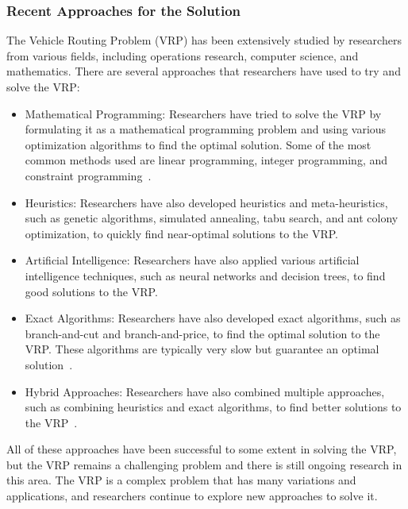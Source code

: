 \subsubsection{Recent Approaches for the Solution}
The Vehicle Routing Problem (VRP) has been extensively studied by researchers from various fields, including operations research, computer science, and mathematics. There are several approaches that researchers have used to try and solve the VRP:
\begin{itemize}
    \item Mathematical Programming: Researchers have tried to solve the VRP by formulating it as a mathematical programming problem and using various optimization algorithms to find the optimal solution.
    Some of the most common methods used are linear programming, integer programming, and constraint programming~\cite{toth2002overview}.
    \item Heuristics: Researchers have also developed heuristics and meta-heuristics, such as genetic algorithms, simulated annealing, tabu search, and ant colony optimization, to quickly find near-optimal solutions to the VRP.
    \item Artificial Intelligence: Researchers have also applied various artificial intelligence techniques, such as neural networks and decision trees, to find good solutions to the VRP.
    \item Exact Algorithms: Researchers have also developed exact algorithms, such as branch-and-cut and branch-and-price, to find the optimal solution to the VRP. These algorithms are typically very slow but guarantee an optimal solution~\cite{laporte1987exact}.
   \item Hybrid Approaches: Researchers have also combined multiple approaches, such as combining heuristics and exact algorithms, to find better solutions to the VRP~\cite{hifi2014hybrid}.
\end{itemize}
All of these approaches have been successful to some extent in solving the VRP, but the VRP remains a challenging problem and there is still ongoing research in this area. The VRP is a complex problem that has many variations and applications, and researchers continue to explore new approaches to solve it.

